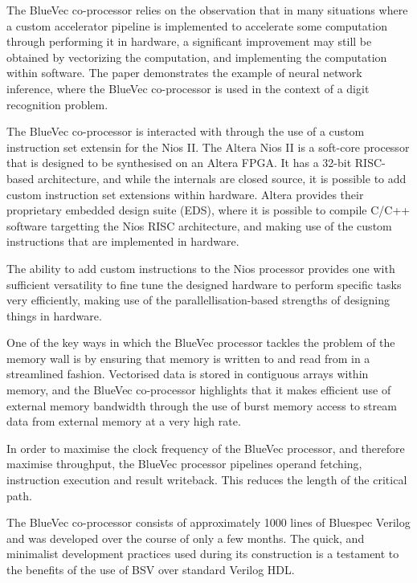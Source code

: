 \documentclass[a4paper,8pt]{report}
\begin{document}
The BlueVec co-processor relies on the observation that in many situations where
a custom accelerator pipeline is implemented to accelerate some computation
through performing it in hardware, a significant improvement may still be obtained
by vectorizing the computation, and implementing the computation within
software. The paper demonstrates the example of neural network inference, where
the BlueVec co-processor is used in the context of a digit recognition problem.

The BlueVec co-processor is interacted with through the use of a custom
instruction set extensin for the Nios II. The Altera Nios II is a soft-core processor
that is designed to be synthesised on an Altera FPGA. It has a 32-bit RISC-based
architecture, and while the internals are closed source, it is possible to add
custom instruction set extensions within hardware. Altera provides their
proprietary embedded design suite (EDS), where it is possible to compile C/C++
software targetting the Nios RISC architecture, and making use of the custom
instructions that are implemented in hardware.

The ability to add custom instructions to the Nios processor provides one with
sufficient versatility to fine tune the designed hardware to perform specific
tasks very efficiently, making use of the parallellisation-based strengths of
designing things in hardware.

One of the key ways in which the BlueVec processor tackles the problem of the
memory wall is by ensuring that memory is written to and read from in a
streamlined fashion. Vectorised data is stored in contiguous arrays within
memory, and the BlueVec co-processor highlights that it makes efficient use of
external memory bandwidth through the use of burst memory access to stream data
from external memory at a very high rate.

In order to maximise the clock frequency of the BlueVec processor, and therefore
maximise throughput, the BlueVec processor pipelines operand fetching,
instruction execution and result writeback. This reduces the length of the
critical path.

The BlueVec co-processor consists of approximately 1000 lines of Bluespec
Verilog and was developed over the course of only a few months. The quick, and
minimalist development practices used during its construction is a testament to
the benefits of the use of BSV over standard Verilog HDL.
\end{document}

